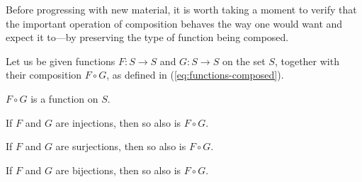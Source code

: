 \medskip

Before progressing with new material, it is worth taking a moment to
verify that the important operation of composition behaves the way one
would want and expect it to---by preserving the type of function being
composed.

\begin{prop}
\label{thm:fn-composition}
Let us be given functions $F: S \rightarrow S$ and $G: S \rightarrow
S$ on the set $S$, together with their composition $F \circ G$, as
defined in (\ref{eq:functions-composed}).

$F \circ G$ is a function on $S$.

If $F$ and $G$ are injections, then so also is $F \circ G$.

If $F$ and $G$ are surjections, then so also is $F \circ G$.

If $F$ and $G$ are bijections, then so also is $F \circ G$.
\end{prop}

